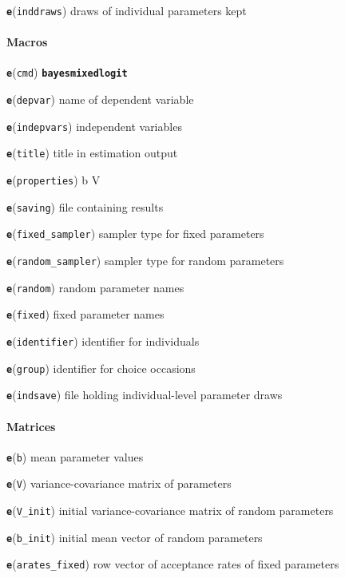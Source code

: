 \documentclass[11pt]{article}
\begin{document}
\textbf{\texttt{e}}(\texttt{inddraws}) draws of individual parameters
kept

\hypertarget{macros}{%
\paragraph{Macros}\label{macros}}

\textbf{\texttt{e}}(\texttt{cmd}) \textbf{\texttt{bayesmixedlogit}}

\textbf{\texttt{e}}(\texttt{depvar}) name of dependent variable

\textbf{\texttt{e}}(\texttt{indepvars}) independent variables

\textbf{\texttt{e}}(\texttt{title}) title in estimation output

\textbf{\texttt{e}}(\texttt{properties}) b V

\textbf{\texttt{e}}(\texttt{saving}) file containing results

\textbf{\texttt{e}}(\texttt{fixed\_sampler}) sampler type for fixed
parameters

\textbf{\texttt{e}}(\texttt{random\_sampler}) sampler type for random
parameters

\textbf{\texttt{e}}(\texttt{random}) random parameter names

\textbf{\texttt{e}}(\texttt{fixed}) fixed parameter names

\textbf{\texttt{e}}(\texttt{identifier}) identifier for individuals

\textbf{\texttt{e}}(\texttt{group}) identifier for choice occasions

\textbf{\texttt{e}}(\texttt{indsave}) file holding individual-level
parameter draws

\hypertarget{matrices}{%
\paragraph{Matrices}\label{matrices}}

\textbf{\texttt{e}}(\texttt{b}) mean parameter values

\textbf{\texttt{e}}(\texttt{V}) variance-covariance matrix of parameters

\textbf{\texttt{e}}(\texttt{V\_init}) initial variance-covariance matrix
of random parameters

\textbf{\texttt{e}}(\texttt{b\_init}) initial mean vector of random
parameters

\textbf{\texttt{e}}(\texttt{arates\_fixed}) row vector of acceptance
rates of fixed parameters
\end{document}
